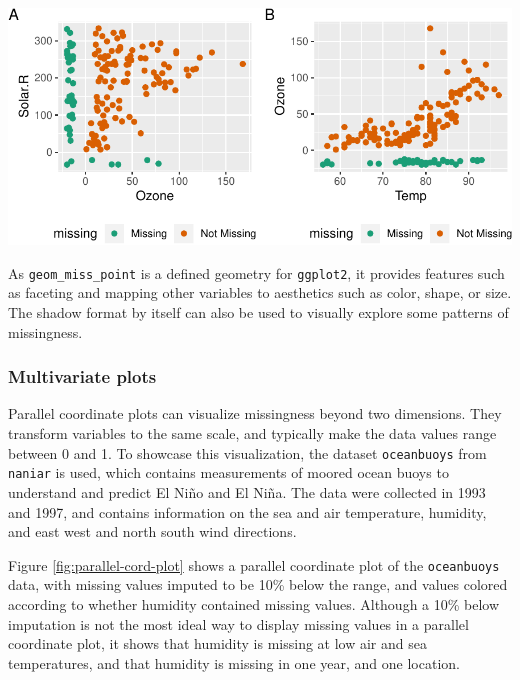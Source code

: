 \documentclass[]{article}
\let\origfigure\figure
\let\endorigfigure\endfigure
\renewenvironment{figure}[1][2] {
    \expandafter\origfigure\expandafter[H]
} {
    \endorigfigure
}
\theoremstyle{definition}
\theoremstyle{definition}
\theoremstyle{definition}
\theoremstyle{remark}
\begin{document}
\begin{figure}

{\centering \includegraphics{tidy-missing-data-paper_files/figure-latex/geom-miss-1} 

}

\caption{Scatterplots with missings displayed at 10 percent below for the airquality dataset. Scatterplots of ozone and solar radiation (A), and ozone and temperature (B). There are missings in ozone and solar radiation, but not temperature.}\label{fig:geom-miss}
\end{figure}

As \texttt{geom\_miss\_point} is a defined geometry for
\texttt{ggplot2}, it provides features such as faceting and mapping
other variables to aesthetics such as color, shape, or size. The shadow
format by itself can also be used to visually explore some patterns of
missingness.

\hypertarget{multivariate-plots}{%
\subsubsection{Multivariate plots}\label{multivariate-plots}}

Parallel coordinate plots can visualize missingness beyond two
dimensions. They transform variables to the same scale, and typically
make the data values range between 0 and 1. To showcase this
visualization, the dataset \texttt{oceanbuoys} from \texttt{naniar} is
used, which contains measurements of moored ocean buoys to understand
and predict El Niño and El Niña. The data were collected in 1993 and
1997, and contains information on the sea and air temperature, humidity,
and east west and north south wind directions.

Figure \ref{fig:parallel-cord-plot} shows a parallel coordinate plot of
the \texttt{oceanbuoys} data, with missing values imputed to be 10\%
below the range, and values colored according to whether humidity
contained missing values. Although a 10\% below imputation is not the
most ideal way to display missing values in a parallel coordinate plot,
it shows that humidity is missing at low air and sea temperatures, and
that humidity is missing in one year, and one location.
\end{document}
